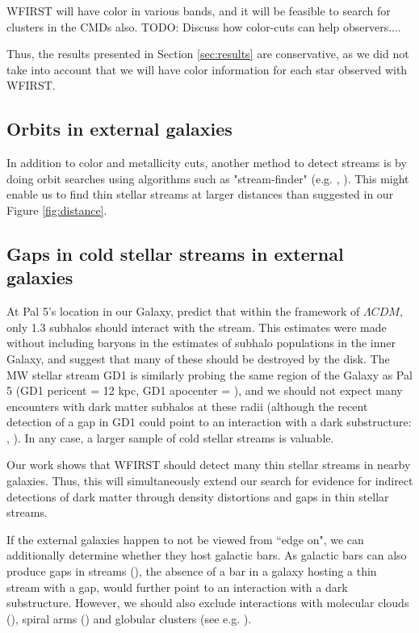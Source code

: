\documentclass[twocolumn]{aastex62}
\newcommand{\todo}[1]{{\color{red} TODO: #1}}
\begin{document}
WFIRST will have color in various bands, and it will be feasible to search for clusters in the CMDs also. \todo{Discuss how color-cuts can help observers...}.

Thus, the results presented in Section \ref{sec:results} are conservative, as we did not take into account that we will have color information for each star observed with WFIRST. 


\subsection{Orbits in external galaxies}
In addition to color and metallicity cuts, another method to detect streams is by doing orbit searches using algorithms such as "stream-finder" (e.g. \citealt{malhan18}, \citealt{ibata19}). This might enable us to find thin stellar streams at larger distances than suggested in our Figure \ref{fig:distance}. 




\subsection{Gaps in cold stellar streams in external galaxies}
 At Pal 5's location in our Galaxy, \citet{bovy17} predict that within the framework of $\Lambda CDM$, only 1.3 subhalos should interact with the stream. This estimates were made without including baryons in the estimates of subhalo populations in the inner Galaxy, and \citet{garrison17} suggest that many of these should be destroyed by the disk. The MW stellar stream GD1 is similarly probing the same region of the Galaxy as Pal 5 (GD1 pericent = 12 kpc, GD1 apocenter = ), and we should not expect many encounters with dark matter subhalos at these radii (although the recent detection of a gap in GD1 could point to an interaction with a dark substructure: \citealt{price18}, \citealt{bonaca19}).  In any case,  a larger sample of cold stellar streams is valuable.  
 
Our work shows that WFIRST should detect many thin stellar streams in nearby galaxies. Thus, this will simultaneously extend our search for evidence for indirect detections of dark matter through density distortions and gaps in thin stellar streams. 

If the external galaxies happen to not be viewed from ``edge on", we can additionally determine whether they host galactic bars. As galactic bars can also produce gaps in streams  (\citealt{pearson17}), the absence of a bar in a galaxy hosting a thin stream with a gap, would further point to an interaction with a dark substructure. However, we should also exclude interactions with molecular clouds (\citealt{amorisco16}), spiral arms (\citealt{banik19}) and globular clusters (see e.g. \citealt{bonaca19}).
\end{document}
